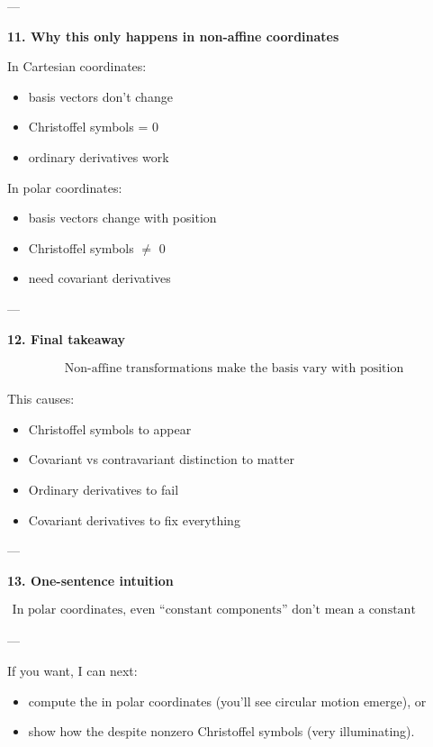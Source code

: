 \documentclass[12pt,a4paper]{report}
\begin{document}
\begin{description}
\begin{description}
---

\item \textbf{11. Why this only happens in non-affine coordinates}

In Cartesian coordinates:

\begin{itemize}
\item basis vectors don’t change
\item Christoffel symbols = 0
\item ordinary derivatives work
\end{itemize}

In polar coordinates:

\begin{itemize}
\item basis vectors change with position
\item Christoffel symbols $\ne$ 0
\item need covariant derivatives
\end{itemize}

---

\item \textbf{12. Final takeaway}

\begin{align*}
\boxed{
\text{Non-affine transformations make the basis vary with position}
}
\end{align*}

This causes:

\begin{itemize}
\item Christoffel symbols to appear
\item Covariant vs contravariant distinction to matter
\item Ordinary derivatives to fail
\item Covariant derivatives to fix everything
\end{itemize}

---

\item \textbf{13. One-sentence intuition}

\begin{align*}
\boxed{
\text{In polar coordinates, even “constant components” don’t mean a constant vector.}
}
\end{align*}

---
\end{description}

If you want, I can next:

\begin{itemize}
\item compute the  in polar coordinates (you’ll see circular motion emerge), or
\item show how the  despite nonzero Christoffel symbols (very illuminating).
\end{itemize}



\end{description}
\end{document}
